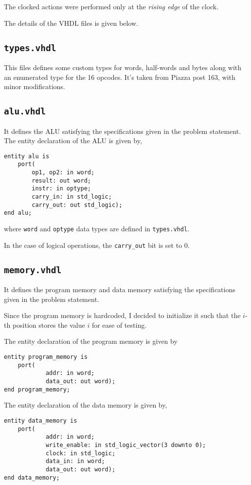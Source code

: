 \documentclass[a4paper]{scrartcl}
\renewcommand{\tt}{\texttt}
\begin{document}
The clocked actions were performed only at the \emph{rising edge} of the clock.

\hspace{-1em}The details of the VHDL files is given below.

\subsection*{\tt{types.vhdl}}
This files defines some custom types for words, half-words and bytes along with an enumerated type for the 16 opcodes. It's taken from Piazza post 163, with minor modifications.

\subsection*{\tt{alu.vhdl}}
It defines the ALU satisfying the specifications given in the problem statement.
The entity declaration of the ALU is given by,
\begin{verbatim}
entity alu is
	port(
		op1, op2: in word;
		result: out word;
		instr: in optype;
		carry_in: in std_logic;
		carry_out: out std_logic);
end alu;
\end{verbatim}
where \tt{word} and \tt{optype} data types are defined in \tt{types.vhdl}.

In the case of logical operations, the \tt{carry_out} bit is set to $0$.

\subsection*{\tt{memory.vhdl}}
It defines the program memory and data memory satisfying the specifications given in the problem statement.

Since the program memory is hardcoded, I decided to initialize it such that the $i$-th position stores the value $i$ for ease of testing.

The entity declaration of the program memory is given by
\begin{verbatim}
entity program_memory is
	port(
		    addr: in word;
		    data_out: out word);
end program_memory;
\end{verbatim}

The entity declaration of the data memory is given by,
\begin{verbatim}
entity data_memory is
	port(
		    addr: in word;
		    write_enable: in std_logic_vector(3 downto 0);
		    clock: in std_logic;
		    data_in: in word;
		    data_out: out word);
end data_memory;
\end{verbatim}
\end{document}
